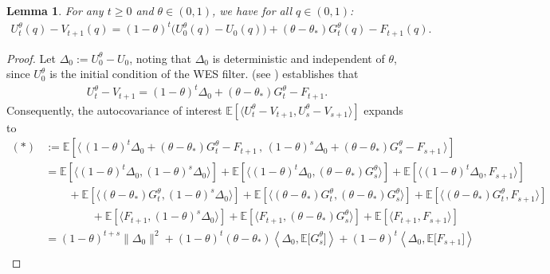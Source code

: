 \documentclass[10pt,a4paper]{amsart}
\newtheorem{lemma}{Lemma}
\newcommand{\E}{\mathbb E}
\begin{document}
\begin{lemma} \label{prop:model_quantile_decomposition}    
	For any $t \ge 0$ and $\theta \in (0, 1)$, we have for all $q \in (0, 1)$:
	\begin{align}
		U_{t}^\theta(q) - V_{t+1}(q) = (1 - \theta)^{t} \big( U_0^\theta(q) - U_0(q) \big) + ( \theta - \theta_* ) G_{t}^\theta(q) - F_{t+1}(q) .
	\end{align}
\end{lemma}

\begin{proof}
Let $\Delta_0 := U_0^\theta - U_0$, noting that $\Delta_0$ is deterministic and independent of $\theta$, since $U_0^\theta$ is the initial condition of the WES filter.
 (see ) establishes that
\begin{align}
    U_{t}^\theta - V_{t+1} = (1 - \theta)^t \Delta_0 + ( \theta - \theta_* ) G_t^\theta - F_{t+1} .
\end{align}
Consequently, the autocovariance of interest $\E[ \langle U_{t}^\theta - V_{t+1},U_{s}^\theta - V_{s+1} \rangle ]$ expands to
\begin{align}
    (*) & := \E[ \langle \, (1 - \theta)^t \Delta_0 + ( \theta - \theta_* ) G_t^\theta - F_{t+1} \, , \, (1 - \theta)^s \Delta_0 + ( \theta - \theta_* ) G_s^\theta - F_{s+1} \, \rangle ] \\
    & = \E\left[ \langle (1-\theta)^t \Delta_0, (1-\theta)^{s} \Delta_0 \rangle \right] + \E\left[ \langle (1-\theta)^t \Delta_0, (\theta - \theta_*) G_s^\theta \rangle \right] + \E\left[ \langle (1-\theta)^t \Delta_0, F_{s+1} \rangle \right] \\
    & \hspace{25pt} + \E\left[ \langle (\theta - \theta_*) G_t^\theta, (1-\theta)^{s} \Delta_0 \rangle \right] + \E\left[ \langle (\theta - \theta_*) G_t^\theta, (\theta - \theta_*) G_s^\theta \rangle \right] + \E\left[ \langle (\theta - \theta_*) G_t^\theta, F_{s+1} \rangle \right] \\
    & \hspace{50pt} + \E\left[ \langle F_{t+1}, (1-\theta)^{s} \Delta_0 \rangle \right] + \E\left[ \langle F_{t+1}, (\theta - \theta_*) G_s^\theta \rangle \right] + \E\left[ \langle F_{t+1}, F_{s+1} \rangle \right] \\
    & = (1-\theta)^{t+s}\|\Delta_0\|^2 + (1-\theta)^t (\theta - \theta_*) \left\langle \Delta_0, \E\big[ G_s^\theta \big] \right\rangle + (1-\theta)^t \left\langle \Delta_0, \E\big[ F_{s+1} \big] \right\rangle \\

\end{align}
\end{proof}
\end{document}
